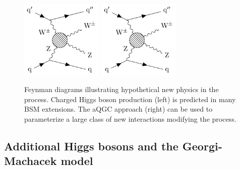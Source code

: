 \begin{figure}[htbp]
  \centering
   \includegraphics[page=1,width=0.35\textwidth]{figures/FeynmanDiagrams/feynmanNP.pdf}
   \includegraphics[page=2,width=0.35\textwidth]{figures/FeynmanDiagrams/feynmanNP.pdf}
  \caption[Feynman diagrams illustrating hypothetical new physics in the \EWWZ process]{
    Feynman diagrams illustrating hypothetical new physics in the \EWWZ process.
    Charged Higgs boson production (left) is predicted in many BSM extensions. The aQGC
    approach (right) can be used to parameterize a large class of new interactions modifying the
    \WWZZ process.
        }
 \label{fig:feynmanNP}
\end{figure}

\subsection{Additional Higgs bosons and the Georgi-Machacek model}

